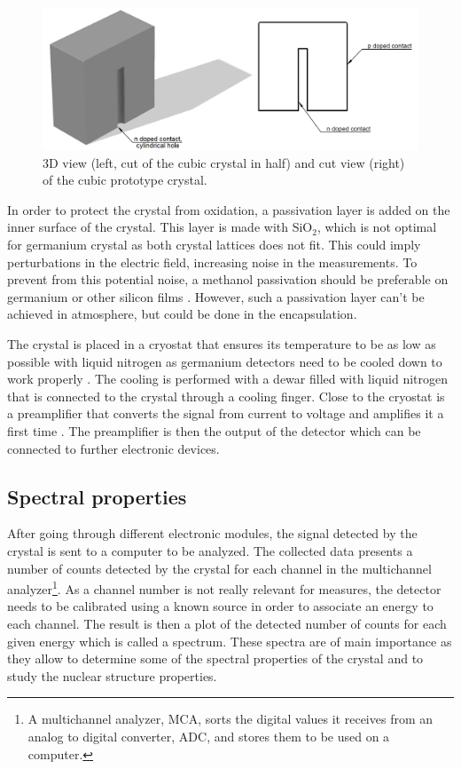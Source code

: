 \documentclass[11pt,a4paper]{article}
\begin{document}
\begin{figure}[!h]
\centering
\includegraphics[scale=0.4]{Crystal.png}
\caption{3D view (left, cut of the cubic crystal in half) and cut view (right) of the cubic prototype crystal.}
\label{geo}
\end{figure}

In order to protect the crystal from oxidation, a passivation layer is added on the inner surface of the crystal. This layer is made with SiO$_2$, which is not optimal for germanium crystal as both crystal lattices does not fit. This could imply perturbations in the electric field, increasing noise in the measurements. To prevent from this potential noise, a methanol passivation \cite{Napoli} should be preferable on germanium or other silicon films \cite{Xie}. However, such a passivation layer can't be achieved in atmosphere, but could be done in the encapsulation.

The crystal is placed in a cryostat that ensures its temperature to be as low as possible with liquid nitrogen as germanium detectors need to be cooled down to work properly \cite{Knoll}. The cooling is performed with a dewar filled with liquid nitrogen that is connected to the crystal through a cooling finger. Close to the cryostat is a preamplifier that converts the signal from current to voltage and amplifies it a first time \cite{Tsoulfanidis}. The preamplifier is then the output of the detector which can be connected to further electronic devices.

\subsection{Spectral properties} \label{spectral}

After going through different electronic modules, the signal detected by the crystal is sent to a computer to be analyzed. The collected data presents a number of counts detected by the crystal for each channel in the multichannel analyzer\footnote{A multichannel analyzer, MCA, sorts the digital values it receives from an analog to digital converter, ADC, and stores them to be used on a computer.}. As a channel number is not really relevant for measures, the detector needs to be calibrated using a known source in order to associate an energy to each channel. The result is then a plot of the detected number of counts for each given energy which is called a spectrum. These spectra are of main importance as they allow to determine some of the spectral properties of the crystal and to study the nuclear structure properties.
\end{document}
